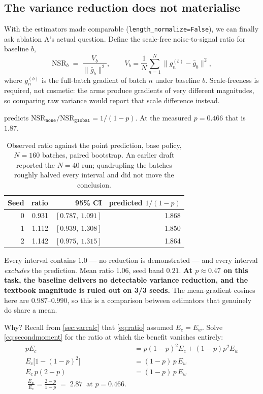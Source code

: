 \documentclass[11pt,letterpaper]{article}
\theoremstyle{definition}
\newcommand{\nsr}{\mathrm{NSR}}
\begin{document}
\subsection{The variance reduction does not materialise}
\label{sec:eweight}

With the estimators made comparable (\texttt{length\_normalize=False}), we can finally ask ablation
A's actual question. Define the scale-free noise-to-signal ratio for baseline $b$,
\begin{equation}
  \nsr_b \;=\; \frac{V_b}{\|\bar{g}_b\|^2},
  \qquad V_b = \frac{1}{N}\sum_{n=1}^{N} \big\| g_n^{(b)} - \bar{g}_b \big\|^2 ,
\end{equation}
where $g_n^{(b)}$ is the full-batch gradient of batch $n$ under baseline $b$. Scale-freeness is
required, not cosmetic: the arms produce gradients of very different magnitudes, so comparing raw
variance would report that scale difference instead.

 predicts $\nsr_{\texttt{none}} / \nsr_{\texttt{global}} = 1/(1-p)$. At the measured
$p = 0.466$ that is $1.87$.

\begin{table}[H]
\centering
\caption{Observed ratio against the point prediction, base policy, $N=160$ batches, paired
bootstrap. An earlier draft reported the $N=40$ run; quadrupling the batches roughly halved every
interval and did not move the conclusion.}
\label{tab:nsr}
\small
\begin{tabular}{@{}rrrr@{}}
\toprule
\textbf{Seed} & \textbf{ratio} & \textbf{95\% CI} & \textbf{predicted $1/(1-p)$} \\
\midrule
0 & 0.931 & $[0.787,\ 1.091]$ & 1.868 \\
1 & 1.112 & $[0.939,\ 1.308]$ & 1.850 \\
2 & 1.142 & $[0.975,\ 1.315]$ & 1.864 \\
\bottomrule
\end{tabular}
\end{table}

Every interval contains $1.0$ --- no reduction is demonstrated --- and every interval \emph{excludes}
the prediction. Mean ratio $1.06$, seed band $0.21$. \textbf{At $p \approx 0.47$ on this task, the
baseline delivers no detectable variance reduction, and the textbook magnitude is ruled out on 3/3
seeds.} The mean-gradient cosines here are $0.987$--$0.990$, so this is a comparison between
estimators that genuinely do share a mean.

Why? Recall from \cref{sec:varcalc} that \cref{eq:ratio} assumed $E_c = E_w$. Solve
\cref{eq:secondmoment} for the ratio at which the benefit vanishes entirely:
\begin{align}
  p E_c &= p(1-p)^2 E_c + (1-p)p^2 E_w \nonumber\\
  E_c\big[1 - (1-p)^2\big] &= (1-p)\,p\,E_w \nonumber\\
  E_c \, p(2-p) &= (1-p)\,p\,E_w \nonumber\\
  \boxed{\;\frac{E_w}{E_c} = \frac{2-p}{1-p} \;=\; 2.87 \ \text{ at } p = 0.466.\;}
  \label{eq:ewec}
\end{align}
\end{document}
